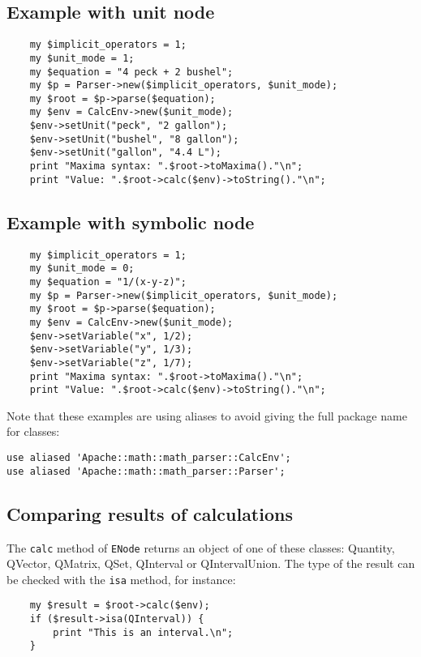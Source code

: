\subsection{Example with unit node}
\begin{verbatim}
    my $implicit_operators = 1;
    my $unit_mode = 1;
    my $equation = "4 peck + 2 bushel";
    my $p = Parser->new($implicit_operators, $unit_mode);
    my $root = $p->parse($equation);
    my $env = CalcEnv->new($unit_mode);
    $env->setUnit("peck", "2 gallon");
    $env->setUnit("bushel", "8 gallon");
    $env->setUnit("gallon", "4.4 L");
    print "Maxima syntax: ".$root->toMaxima()."\n";
    print "Value: ".$root->calc($env)->toString()."\n";
\end{verbatim}

\subsection{Example with symbolic node}
\begin{verbatim}
    my $implicit_operators = 1;
    my $unit_mode = 0;
    my $equation = "1/(x-y-z)";
    my $p = Parser->new($implicit_operators, $unit_mode);
    my $root = $p->parse($equation);
    my $env = CalcEnv->new($unit_mode);
    $env->setVariable("x", 1/2);
    $env->setVariable("y", 1/3);
    $env->setVariable("z", 1/7);
    print "Maxima syntax: ".$root->toMaxima()."\n";
    print "Value: ".$root->calc($env)->toString()."\n";
\end{verbatim}

Note that these examples are using aliases to avoid giving the full package name for classes:
\begin{verbatim}
use aliased 'Apache::math::math_parser::CalcEnv';
use aliased 'Apache::math::math_parser::Parser';
\end{verbatim}

\subsection{Comparing results of calculations}
The \texttt{calc} method of \texttt{ENode} returns an object of one of these classes: Quantity, QVector, QMatrix, QSet, QInterval or QIntervalUnion. The type of the result can be checked with the \texttt{isa} method, for instance:
\begin{verbatim}
    my $result = $root->calc($env);
    if ($result->isa(QInterval)) {
        print "This is an interval.\n";
    }
\end{verbatim}


